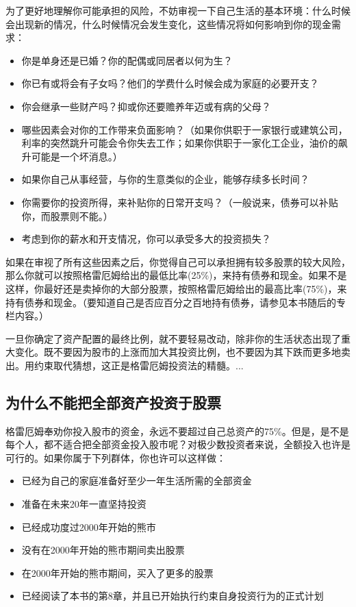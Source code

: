 \documentclass[12pt,oneside]{book}
\begin{document}
为了更好地理解你可能承担的风险，不妨审视一下自己生活的基本环境：什么时候会出现新的情况，什么时候情况会发生变化，这些情况将如何影响到你的现金需求：

\begin{itemize}
\item 你是单身还是已婚？你的配偶或同居者以何为生？
\item 你已有或将会有子女吗？他们的学费什么时候会成为家庭的必要开支？
\item 你会继承一些财产吗？抑或你还要赡养年迈或有病的父母？
\item 哪些因素会对你的工作带来负面影响？（如果你供职于一家银行或建筑公司，利率的突然跳升可能会令你失去工作；如果你供职于一家化工企业，油价的飙升可能是一个坏消息。）
\item 如果你自己从事经营，与你的生意类似的企业，能够存续多长时间？
\item 你需要你的投资所得，来补贴你的日常开支吗？（一般说来，债券可以补贴你，而股票则不能。）
\item 考虑到你的薪水和开支情况，你可以承受多大的投资损失？
\end{itemize}

如果在审视了所有这些因素之后，你觉得自己可以承担拥有较多股票的较大风险，那么你就可以按照格雷厄姆给出的最低比率(25\%)，来持有债券和现金。如果不是这样，你最好还是卖掉你的大部分股票，按照格雷厄姆给出的最高比率(75\%)，来持有债券和现金。（要知道自己是否应百分之百地持有债券，请参见本书随后的专栏内容。）

一旦你确定了资产配置的最终比例，就不要轻易改动，除非你的生活状态出现了重大变化。既不要因为股市的上涨而加大其投资比例，也不要因为其下跌而更多地卖出。用约束取代猜想，这正是格雷厄姆投资法的精髓。...


\subsection{为什么不能把全部资产投资于股票}
格雷厄姆奉劝你投入股市的资金，永远不要超过自己总资产的75\%。但是，是不是每个人，都不适合把全部资金投入股市呢？对极少数投资者来说，全额投入也许是可行的。如果你属于下列群体，你也许可以这样做：

\begin{itemize}
\item 已经为自己的家庭准备好至少一年生活所需的全部资金
\item 准备在未来20年一直坚持投资
\item 已经成功度过2000年开始的熊市
\item 没有在2000年开始的熊市期间卖出股票
\item 在2000年开始的熊市期间，买入了更多的股票
\item 已经阅读了本书的第8章，并且已开始执行约束自身投资行为的正式计划

\end{itemize}
\end{document}
